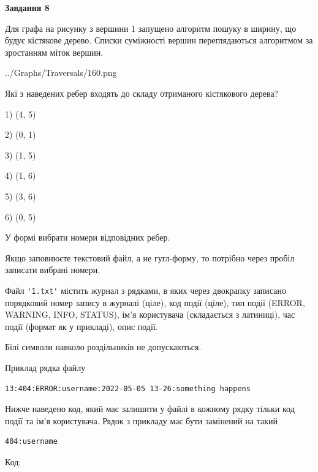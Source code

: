 \documentclass[12pt, ukrainian]{article}
\def\code#1{\Verb!#1!}
\begin{document}
{\begin {large}
{\begin {center}\textbf{Завдання 8}\end {center}}\par
Для графа на рисунку з вершини 1 запущено алгоритм пошуку в ширину, що будує кістякове дерево. Списки суміжності вершин переглядаються алгоритмом за зростанням міток вершин.\par
\begin{center}
	{../Graphs/Traversals/160.png}
\end{center}
\par Які з наведених ребер входять до складу отриманого кістякового дерева?\par
1) (4, 5)\par
2) (0, 1)\par
3) (1, 5)\par
4) (1, 6)\par
5) (3, 6)\par
6) (0, 5)\par
{\vskip 15pt} У формі вибрати номери відповідних ребер.


Якщо заповнюєте текстовий файл, а не гугл-форму, то потрібно через пробіл записа\-ти вибрані номери.\par
\newpage


Файл \code{'1.txt'} містить журнал з рядками, в яких через двокрапку записано поряд\-ко\-вий номер запису в журналі (ціле), код події (ціле), тип події (ERROR, \\WARNING, INFO, STATUS), ім'я користувача (складається з латиниці), час події (фор\-мат як у прикладі), опис події.

Білі символи навколо роздільників не допускаються.

Приклад рядка файлу



\begin{verbatim}
13:404:ERROR:username:2022-05-05 13-26:something happens
\end{verbatim}


Нижче наведено код, який має залишити у файлі в кожному рядку тільки код події та ім'я користувача. Рядок з прикладу має бути замінений на такий



\begin{verbatim}
404:username
\end{verbatim}




Код:




\end{large}}
\end{document}
